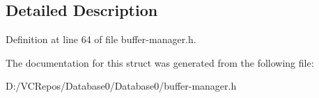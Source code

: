 \subsection{Detailed Description}


Definition at line 64 of file buffer-\/manager.\+h.



The documentation for this struct was generated from the following file\+:\begin{DoxyCompactItemize}
\item 
D\+:/\+V\+C\+Repos/\+Database0/\+Database0/buffer-\/manager.\+h\end{DoxyCompactItemize}
